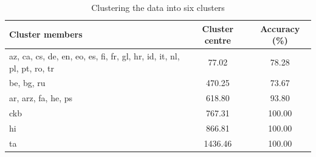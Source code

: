 \begin{table}[h]
\centering
\caption{Clustering the data into six clusters}
\label{tab:clusters}
\begin{tabular}{@{}lcc@{}}
\toprule
\textbf{Cluster members} & \textbf{Cluster centre} & \textbf{Accuracy (\%)} \\
\midrule
az, ca, cs, de, en, eo, es, fi, fr, gl, hr, id, it, nl, pl, pt, ro, tr & 77.02 & 78.28 \\
be, bg, ru & 470.25 & 73.67 \\
ar, arz, fa, he, ps & 618.80 & 93.80 \\
ckb & 767.31 & 100.00 \\
hi & 866.81 & 100.00 \\
ta & 1436.46 & 100.00 \\
\bottomrule
\end{tabular}
\end{table}
